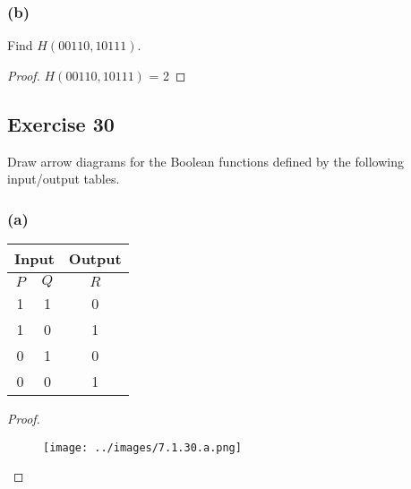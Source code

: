 \documentclass[14pt]{extarticle}
\newcommand{\cy}{\color{cyan}}
\begin{document}
\subsubsection{(b)}
Find \(H(00110, 10111)\).

\begin{proof}
    \(H(00110, 10111)\) = 2
\end{proof}

\subsection{Exercise 30}
Draw arrow diagrams for the Boolean functions defined by the following input/output tables.

\subsubsection{(a)}
\begin{center}
    \begin{tabular}{|cc|c|}
        \hline
        \multicolumn{2}{|c|}{\cy Input} & {\cy Output}       \\
        \hline
        $P$                             & $Q$          & $R$ \\
        \hline
        1                               & 1            & 0   \\
        \hline
        1                               & 0            & 1   \\
        \hline
        0                               & 1            & 0   \\
        \hline
        0                               & 0            & 1   \\
        \hline
    \end{tabular}
\end{center}

\begin{proof}
    \begin{figure}[ht!]
        \centering
        \texttt{[image: ../images/7.1.30.a.png]}
    \end{figure}
\end{proof}
\end{document}
